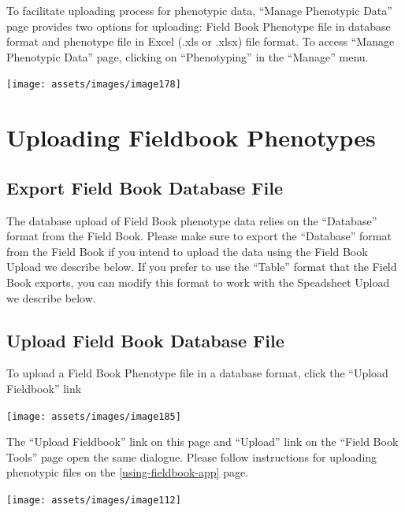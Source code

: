 \documentclass[
  12pt,
]{book}
\begin{document}
To facilitate uploading process for phenotypic data, ``Manage Phenotypic Data'' page provides two options for uploading: Field Book Phenotype file in database format and phenotype file in Excel (.xls or .xlsx) file format. To access ``Manage Phenotypic Data'' page, clicking on ``Phenotyping'' in the ``Manage'' menu.

\begin{center}\texttt{[image: assets/images/image178]} \end{center}

\hypertarget{uploading-fieldbook-phenotypes}{%
\section{Uploading Fieldbook Phenotypes}\label{uploading-fieldbook-phenotypes}}

\hypertarget{export-field-book-database-file}{%
\subsection{Export Field Book Database File}\label{export-field-book-database-file}}

The database upload of Field Book phenotype data relies on the ``Database'' format from the Field Book. Please make sure to export the ``Database'' format from the Field Book if you intend to upload the data using the Field Book Upload we describe below. If you prefer to use the ``Table'' format that the Field Book exports, you can modify this format to work with the Speadsheet Upload we describe below.

\hypertarget{upload-field-book-database-file}{%
\subsection{Upload Field Book Database File}\label{upload-field-book-database-file}}

To upload a Field Book Phenotype file in a database format, click the ``Upload Fieldbook'' link

\begin{center}\texttt{[image: assets/images/image185]} \end{center}

The ``Upload Fieldbook'' link on this page and ``Upload'' link on the ``Field Book Tools'' page open the same dialogue. Please follow instructions for uploading phenotypic files on the \ref{using-fieldbook-app} page.

\begin{center}\texttt{[image: assets/images/image112]} \end{center}
\end{document}
